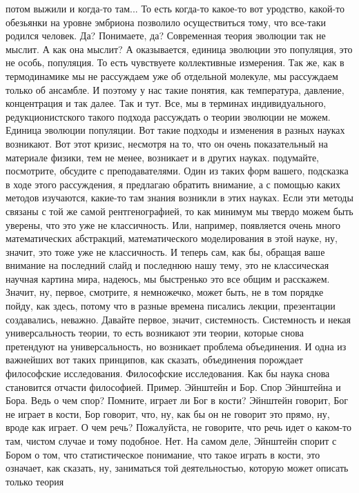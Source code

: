 потом выжили и когда-то там... То есть когда-то какое-то вот уродство, какой-то
обезьянки на уровне эмбриона позволило осуществиться тому, что все-таки родился
человек. Да? Понимаете, да? Современная теория эволюции так не мыслит. А как она
мыслит? А оказывается, единица эволюции это популяция, это не особь, популяция.
То есть чувствуете коллективные измерения. Так же, как в термодинамике мы не
рассуждаем уже об отдельной молекуле, мы рассуждаем только об ансамбле. И
поэтому у нас такие понятия, как температура, давление, концентрация и так
далее. Так и тут. Все, мы в терминах индивидуального, редукционистского такого
подхода рассуждать о теории эволюции не можем. Единица эволюции популяции. Вот
такие подходы и изменения в разных науках возникают. Вот этот кризис, несмотря
на то, что он очень показательный на материале физики, тем не менее, возникает и
в других науках. подумайте, посмотрите, обсудите с преподавателями. Один из
таких форм вашего, подсказка в ходе этого рассуждения, я предлагаю обратить
внимание, а с помощью каких методов изучаются, какие-то там знания возникли в
этих науках. Если эти методы связаны с той же самой рентгенографией, то как
минимум мы твердо можем быть уверены, что это уже не классичность. Или,
например, появляется очень много математических абстракций, математического
моделирования в этой науке, ну, значит, это тоже уже не классичность. И теперь
сам, как бы, обращая ваше внимание на последний слайд и последнюю нашу тему, это
не классическая научная картина мира, надеюсь, мы быстренько это все общим и
расскажем. Значит, ну, первое, смотрите, я немножечко, может быть, не в том
порядке пойду, как здесь, потому что в разные времена писались лекции,
презентации создавались, неважно. Давайте первое, значит, системность.
Системность и некая универсальность теории, то есть возникают эти теории,
которые снова претендуют на универсальность, но возникает проблема объединения.
И одна из важнейших вот таких принципов, как сказать, объединения порождает
философские исследования. Философские исследования. Как бы наука снова
становится отчасти философией. Пример. Эйнштейн и Бор. Спор Эйнштейна и Бора.
Ведь о чем спор? Помните, играет ли Бог в кости? Эйнштейн говорит, Бог не играет
в кости, Бор говорит, что, ну, как бы он не говорит это прямо, ну, вроде как
играет. О чем речь? Пожалуйста, не говорите, что речь идет о каком-то там,
чистом случае и тому подобное. Нет. На самом деле, Эйнштейн спорит с Бором о
том, что статистическое понимание, что такое играть в кости, это означает, как
сказать, ну, заниматься той деятельностью, которую может описать только теория

